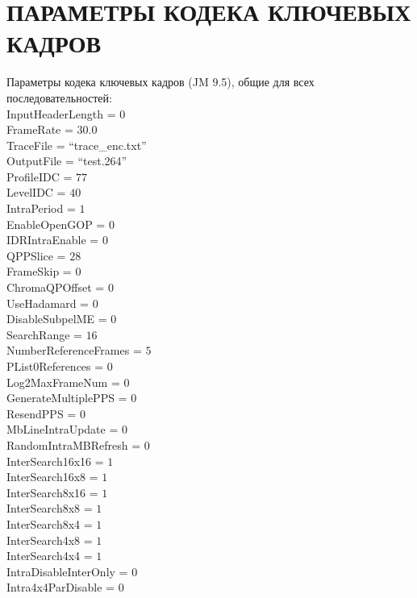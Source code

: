 \chapter{ПАРАМЕТРЫ КОДЕКА КЛЮЧЕВЫХ КАДРОВ}
\label{AppB}

Параметры кодека ключевых кадров (JM 9.5), общие для всех последовательностей: \\
InputHeaderLength     = $0$ \\
FrameRate             = $30.0$ \\
TraceFile             = ``trace\_enc.txt'' \\
OutputFile            = ``test.264'' \\
ProfileIDC            = $77$ \\
LevelIDC              = $40$ \\
IntraPeriod           =  $1$ \\
EnableOpenGOP         =  $0$ \\
IDRIntraEnable        =  $0$ \\
QPPSlice              = $28$ \\
FrameSkip             =  $0$ \\
ChromaQPOffset        =  $0$ \\
UseHadamard           =  $0$ \\
DisableSubpelME       =  $0$ \\
SearchRange           = $16$ \\
NumberReferenceFrames =  $5$ \\
PList0References      =  $0$ \\
Log2MaxFrameNum       =  $0$ \\
GenerateMultiplePPS   =  $0$ \\
ResendPPS             =  $0$ \\
MbLineIntraUpdate     =  $0$ \\
RandomIntraMBRefresh  =  $0$ \\
InterSearch16x16      =  $1$ \\
InterSearch16x8       =  $1$ \\
InterSearch8x16       =  $1$ \\
InterSearch8x8        =  $1$ \\
InterSearch8x4        =  $1$ \\
InterSearch4x8        =  $1$ \\
InterSearch4x4        =  $1$ \\
IntraDisableInterOnly  = $0$ \\
Intra4x4ParDisable     = $0$ \\
